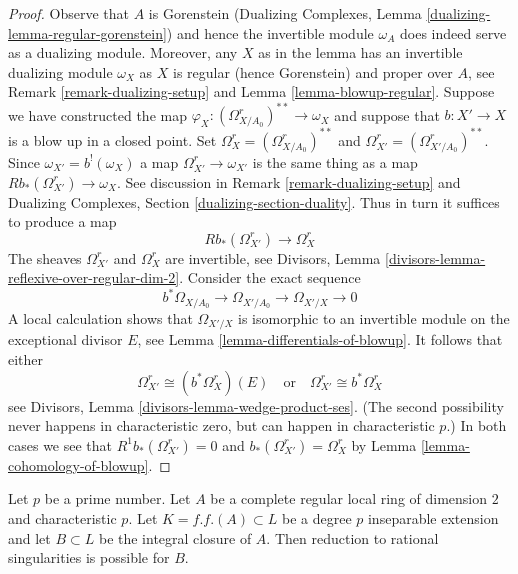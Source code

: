 \begin{proof}
Observe that $A$ is Gorenstein (Dualizing Complexes,
Lemma \ref{dualizing-lemma-regular-gorenstein})
and hence the invertible module $\omega_A$ does indeed serve
as a dualizing module. Moreover, any $X$ as in the lemma
has an invertible dualizing module $\omega_X$ as $X$ is regular
(hence Gorenstein) and proper over $A$, see
Remark \ref{remark-dualizing-setup} and
Lemma \ref{lemma-blowup-regular}.
Suppose we have constructed the map
$\varphi_X : (\Omega^r_{X/A_0})^{**} \to \omega_X$
and suppose that $b : X' \to X$ is a blow up in a closed point.
Set $\Omega^r_X = (\Omega^r_{X/A_0})^{**}$ and
$\Omega^r_{X'} = (\Omega^r_{X'/A_0})^{**}$. Since $\omega_{X'} = b^!(\omega_X)$
a map $\Omega^r_{X'} \to \omega_{X'}$ is the same thing as a map
$Rb_*(\Omega^r_{X'}) \to \omega_X$. See discussion in
Remark \ref{remark-dualizing-setup} and
Dualizing Complexes, Section \ref{dualizing-section-duality}.
Thus in turn it suffices to produce a map
$$
Rb_*(\Omega^r_{X'}) \longrightarrow \Omega^r_X
$$
The sheaves $\Omega^r_{X'}$ and $\Omega^r_X$ are invertible, see
Divisors, Lemma \ref{divisors-lemma-reflexive-over-regular-dim-2}.
Consider the exact sequence
$$
b^*\Omega_{X/A_0} \to \Omega_{X'/A_0} \to \Omega_{X'/X} \to 0
$$
A local calculation shows that $\Omega_{X'/X}$ is isomorphic
to an invertible module on the exceptional divisor $E$, see
Lemma \ref{lemma-differentials-of-blowup}. It follows that
either
$$
\Omega^r_{X'} \cong (b^*\Omega^r_X)(E)
\quad\text{or}\quad
\Omega^r_{X'} \cong b^*\Omega^r_X
$$
see Divisors, Lemma \ref{divisors-lemma-wedge-product-ses}.
(The second possibility never happens in characteristic zero, but
can happen in characteristic $p$.) In both cases we see that
$R^1b_*(\Omega^r_{X'}) = 0$ and $b_*(\Omega^r_{X'}) = \Omega^r_X$ by
Lemma \ref{lemma-cohomology-of-blowup}.
\end{proof}

\begin{lemma}
\label{lemma-go-up-degree-p}
Let $p$ be a prime number. Let $A$ be a complete regular local ring of
dimension $2$ and characteristic $p$. Let $K = f.f.(A) \subset L$ be a
degree $p$ inseparable extension and let $B \subset L$ be the integral
closure of $A$. Then reduction to rational singularities is possible for $B$.
\end{lemma}

